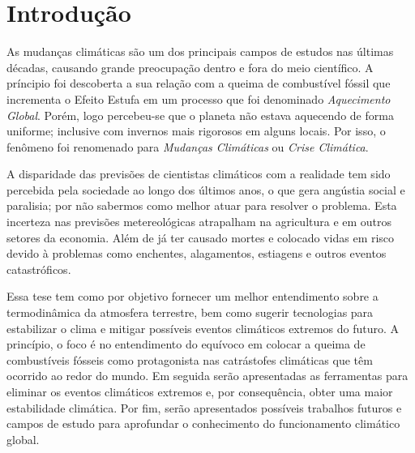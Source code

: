 \chapter*[Introdução]{Introdução}

As mudanças climáticas são um dos principais campos de estudos nas últimas décadas, causando grande preocupação dentro e fora do meio científico. A príncipio foi descoberta a sua relação com a queima de combustível fóssil que incrementa o Efeito Estufa em um processo que foi denominado \textit{Aquecimento Global}. Porém, logo percebeu-se que o planeta não estava aquecendo de forma uniforme; inclusive com invernos mais rigorosos em alguns locais. Por isso, o fenômeno foi renomenado para \textit{Mudanças Climáticas} ou \textit{Crise Climática}.
\par 
A disparidade das previsões de cientistas climáticos com a realidade tem sido percebida pela sociedade ao longo dos últimos anos, o que gera angústia social e paralisia; por não sabermos como melhor atuar para resolver o problema. Esta incerteza nas previsões metereológicas atrapalham na agricultura e em outros setores da economia. Além de já ter causado mortes e colocado vidas em risco devido à problemas como enchentes, alagamentos, estiagens e outros eventos catastróficos. 
\par 
Essa tese tem como por objetivo fornecer um melhor entendimento sobre a termodinâmica da atmosfera terrestre, bem como sugerir tecnologias para estabilizar o clima e mitigar possíveis eventos climáticos extremos do futuro. A princípio, o foco é no entendimento do equívoco em colocar a queima de combustíveis fósseis como protagonista nas catrástofes climáticas que têm ocorrido ao redor do mundo. Em seguida serão apresentadas as ferramentas para eliminar os eventos climáticos extremos e, por consequência, obter uma maior estabilidade climática. Por fim, serão apresentados possíveis trabalhos futuros e campos de estudo para aprofundar o conhecimento do funcionamento climático global.